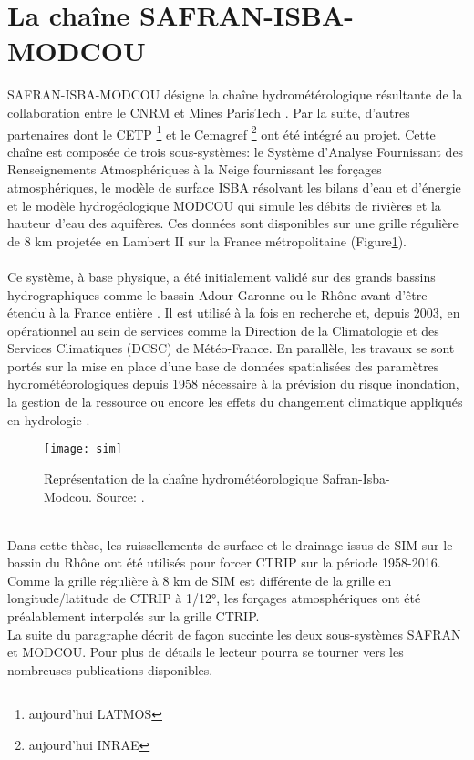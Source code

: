 \section{{\selectfont La chaîne SAFRAN-ISBA-MODCOU}}
SAFRAN-ISBA-MODCOU \citep{habets2008,lemoigne2020} désigne la chaîne hydrométérologique résultante de la collaboration entre le CNRM et Mines ParisTech \citep{etchevers2000}. Par la suite, d'autres partenaires dont le CETP \footnote{aujourd'hui LATMOS} et le Cemagref \footnote{aujourd'hui INRAE} ont été intégré au projet. Cette chaîne est composée de trois sous-systèmes: le Système d'Analyse Fournissant des Renseignements Atmosphériques à la Neige \citep[SAFRAN,][]{durand1993} fournissant les forçages atmosphériques, le modèle de surface ISBA résolvant les bilans d'eau et d'énergie et le modèle hydrogéologique MODCOU \citep{ledoux1989} qui simule les débits de rivières et la hauteur d'eau des aquifères. Ces données sont disponibles sur une grille régulière de 8 km projetée en Lambert II sur la France métropolitaine (Figure\ref{fig_sim}). \\

~\\
\noindent Ce système, à base physique, a été initialement validé sur des grands bassins hydrographiques comme le bassin Adour-Garonne \citep{voirin2003} ou le Rhône \citep{etchevers2001} avant d'être étendu à la France entière \citep{habets2008, quintana2008}. Il est utilisé à la fois en recherche et, depuis 2003, en opérationnel au sein de services comme la Direction de la Climatologie et des Services Climatiques (DCSC) de Météo-France. En parallèle, les travaux se sont portés sur la mise en place d'une base de données spatialisées des paramètres hydrométéorologiques depuis 1958 nécessaire à la prévision du risque inondation, la gestion de la ressource ou encore les effets du changement climatique appliqués en hydrologie \citep{soubeyroux2008, bonnet2017, dayon2018}.\\

\begin{figure}[h!]
\centering
\texttt{[image: sim]}
\caption{Représentation de la chaîne hydrométéorologique Safran-Isba-Modcou. Source: \citet{soubeyroux2008}.}
\label{fig_sim}
\end{figure}
~\\

Dans cette thèse, les ruissellements de surface et le drainage issus de SIM sur le bassin du Rhône ont été utilisés pour forcer CTRIP sur la période 1958-2016. Comme la grille régulière à 8 km de SIM est différente de la grille en longitude/latitude de CTRIP à 1/12°, les forçages atmosphériques ont été préalablement interpolés sur la grille CTRIP.\\
\clearpage
\noindent La suite du paragraphe décrit de façon succinte les deux sous-systèmes SAFRAN et MODCOU. Pour plus de détails le lecteur pourra se tourner vers les nombreuses publications disponibles.

